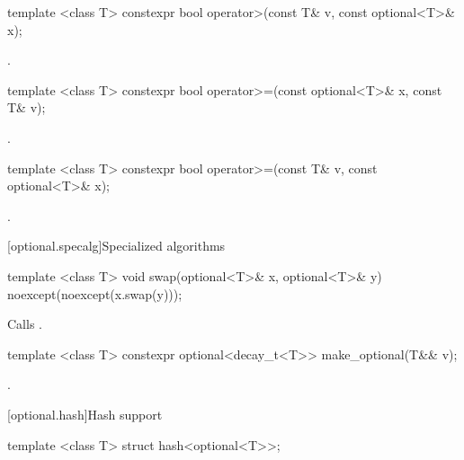 %
\begin{itemdecl}
template <class T> constexpr bool operator>(const T& v, const optional<T>& x);
\end{itemdecl}

\begin{itemdescr}
\pnum
\returns
{}.
\end{itemdescr}

%
\begin{itemdecl}
template <class T> constexpr bool operator>=(const optional<T>& x, const T& v);
\end{itemdecl}

\begin{itemdescr}
\pnum
\returns
{}.
\end{itemdescr}

%
\begin{itemdecl}
template <class T> constexpr bool operator>=(const T& v, const optional<T>& x);
\end{itemdecl}

\begin{itemdescr}
\pnum
\returns
{}.
\end{itemdescr}


[optional.specalg]{Specialized algorithms}

%
\begin{itemdecl}
template <class T> void swap(optional<T>& x, optional<T>& y) noexcept(noexcept(x.swap(y)));
\end{itemdecl}

\begin{itemdescr}
\pnum
\effects
Calls .
\end{itemdescr}

%
\begin{itemdecl}
template <class T> constexpr optional<decay_t<T>> make_optional(T&& v);
\end{itemdecl}

\begin{itemdescr}
\pnum
\returns
{}.
\end{itemdescr}


[optional.hash]{Hash support}

%
\begin{itemdecl}
template <class T> struct hash<optional<T>>;
\end{itemdecl}

